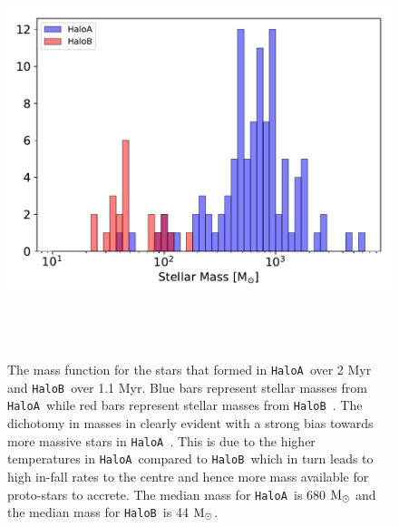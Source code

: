 \documentclass[graphics, twocolumn, usenatbib]{mn2e}
\newcommand{\msolar} {$\rm{M_{\odot}}~$}
\newcommand{\msolarc} {$\rm{M_{\odot}}$}
\newcommand{\ha} {\texttt{HaloA~}}
\newcommand{\hb} {\texttt{HaloB~}}
\begin{document}
\begin{figure}
\centering
\begin{minipage}{175mm}      \begin{center}
\centerline{
    \includegraphics[width=18.0cm, height=12cm]{FIGURES/FinalMass_MultipleHaloes.pdf}}
\caption{
  The mass function for the stars that formed in \ha over 2 Myr and \hb over 1.1 Myr.
  Blue bars represent stellar masses from \ha while red bars represent stellar masses from \hb.
  The dichotomy in masses in clearly evident with a strong bias towards more massive stars
  in \ha. This is due to the higher temperatures in \ha compared to \hb which in turn
  leads to high in-fall rates to the centre and hence more mass available for proto-stars
  to accrete. The median mass for \ha is 680 \msolar and the median mass for \hb is 44 \msolarc. 
}
\label{Fig:MassFunction}
\end{center} \end{minipage}
\end{figure}
\end{document}
